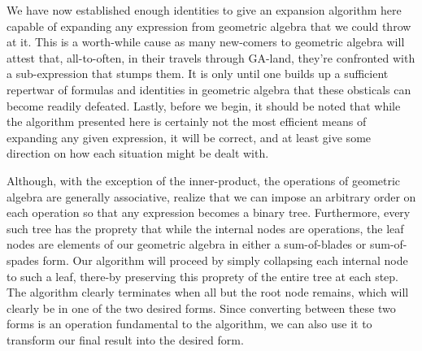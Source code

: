 \documentclass{birkjour}
\theoremstyle{definition}
\theoremstyle{remark}
\numberwithin{equation}{section}
\begin{document}
We have now established enough identities to give an expansion algorithm here capable of expanding
any expression from geometric algebra that we could throw at it.  This is a worth-while cause as many
new-comers to geometric algebra will attest that, all-to-often, in their travels through GA-land, they're
confronted with a sub-expression that stumps them.  It is only until one builds up a sufficient repertwar of
formulas and identities in geometric algebra that these obsticals can become readily defeated.
Lastly, before we begin, it should be noted that while the algorithm presented here is certainly not the most efficient
means of expanding any given expression, it will be correct, and at least give some direction on how each
situation might be dealt with.

Although, with the exception of the inner-product, the operations of geometric algebra are generally associative,
realize that we can impose an arbitrary order on each operation so that any expression becomes a binary tree.
Furthermore, every such tree has the proprety that while the internal nodes are operations, the leaf nodes
are elements of our geometric algebra in either a sum-of-blades or sum-of-spades form.  Our algorithm
will proceed by simply collapsing each internal node to such a leaf, there-by preserving this proprety of the
entire tree at each step.  The algorithm clearly terminates when all but the root node remains, which will clearly be
in one of the two desired forms.  Since converting between these two forms is an operation fundamental to
the algorithm, we can also use it to transform our final result into the desired form.
\end{document}
